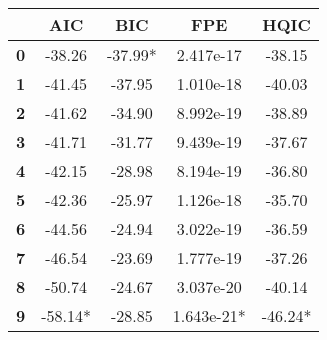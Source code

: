 \documentclass{report}
\begin{document}
\begin{center}
\begin{tabular}{lcccc}
\toprule
           & \textbf{AIC} & \textbf{BIC} & \textbf{FPE} & \textbf{HQIC}  \\
\midrule
\textbf{0} &      -38.26  &     -37.99*  &   2.417e-17  &       -38.15   \\
\textbf{1} &      -41.45  &      -37.95  &   1.010e-18  &       -40.03   \\
\textbf{2} &      -41.62  &      -34.90  &   8.992e-19  &       -38.89   \\
\textbf{3} &      -41.71  &      -31.77  &   9.439e-19  &       -37.67   \\
\textbf{4} &      -42.15  &      -28.98  &   8.194e-19  &       -36.80   \\
\textbf{5} &      -42.36  &      -25.97  &   1.126e-18  &       -35.70   \\
\textbf{6} &      -44.56  &      -24.94  &   3.022e-19  &       -36.59   \\
\textbf{7} &      -46.54  &      -23.69  &   1.777e-19  &       -37.26   \\
\textbf{8} &      -50.74  &      -24.67  &   3.037e-20  &       -40.14   \\
\textbf{9} &     -58.14*  &      -28.85  &  1.643e-21*  &      -46.24*   \\
\bottomrule
\end{tabular}
\end{center}
\end{document}
